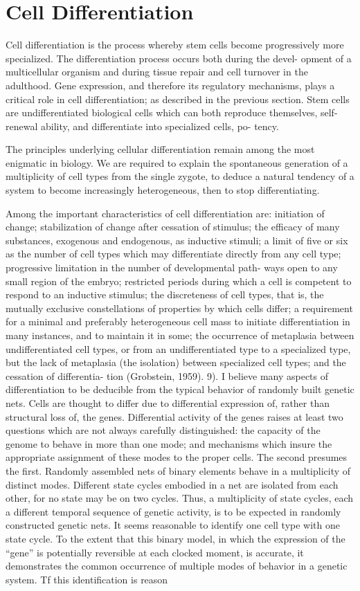 \section{Cell Differentiation}
Cell differentiation is the process whereby stem cells become progressively
more specialized. The differentiation process occurs both during the devel-
opment of a multicellular organism and during tissue repair and cell turnover
in the adulthood. Gene expression, and therefore its regulatory mechanisms,
plays a critical role in cell differentiation; as described in the previous section.
Stem cells are undifferentiated biological cells which can both reproduce
themselves, self-renewal ability, and differentiate into specialized cells, po-
tency.

The principles underlying cellular differentiation remain among the most
enigmatic in biology. We are required to explain the spontaneous generation of a multiplicity of cell types from the single zygote, to deduce a natural
tendency of a system to become increasingly heterogeneous, then to stop
differentiating.

Among the important characteristics of cell differentiation are: initiation
of change; stabilization of change after cessation of stimulus; the efficacy of
many substances, exogenous and endogenous, as inductive stimuli; a limit
of five or six as the number of cell types which may differentiate directly from
any cell type; progressive limitation in the number of developmental path-
ways open to any small region of the embryo; restricted periods during which
a cell is competent to respond to an inductive stimulus; the discreteness of
cell types, that is, the mutually exclusive constellations of properties by
which cells differ; a requirement for a minimal and preferably heterogeneous
cell mass to initiate differentiation in many instances, and to maintain it in
some; the occurrence of metaplasia between undifferentiated cell types, or
from an undifferentiated type to a specialized type, but the lack of metaplasia
(the isolation) between specialized cell types; and the cessation of differentia-
tion (Grobstein, 1959).
9).
I believe many aspects of differentiation to be deducible from the typical
behavior of randomly built genetic nets.
Cells are thought to differ due to differential expression of, rather than
structural loss of, the genes. Differential activity of the genes raises at least
two questions which are not always carefully distinguished: the capacity of
the genome to behave in more than one mode; and mechanisms which insure
the appropriate assignment of these modes to the proper cells. The second
presumes the first.
Randomly assembled nets of binary elements behave in a multiplicity
of
distinct modes. Different state cycles embodied in a net are isolated from
each other, for no state may be on two cycles. Thus, a multiplicity
of state
cycles, each a different temporal sequence of genetic activity, is to be expected
in randomly constructed genetic nets. It seems reasonable to identify one cell
type with one state cycle. To the extent that this binary model, in which the
expression of the “gene” is potentially reversible at each clocked moment, is
accurate, it demonstrates the common occurrence of multiple modes of
behavior in a genetic system.
Tf this identification is reason
